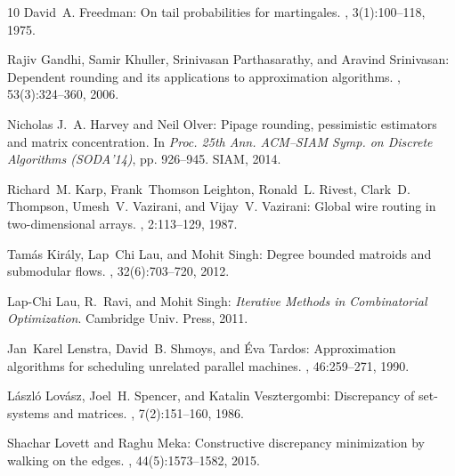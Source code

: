 \documentclass[11pt]{article}
\theoremstyle{definition}
\begin{document}
\begin{thebibliography}{10}
{\sc David~A. Freedman}: On tail probabilities for martingales.
, 3(1):100--118, 1975.

{\sc Rajiv Gandhi, Samir Khuller, Srinivasan Parthasarathy, and Aravind
  Srinivasan}: Dependent rounding and its applications to approximation
  algorithms.
, 53(3):324--360, 2006.
\newblock [\epfmtdoi{10.1145/1147954.1147956}]

{\sc Nicholas J.~A. Harvey and Neil Olver}: Pipage rounding, pessimistic
  estimators and matrix concentration.
\newblock In {\em Proc. 25th Ann. ACM--SIAM Symp. on Discrete Algorithms
  (SODA'14)}, pp. 926--945. SIAM, 2014.
\newblock [\epfmtdoi{10.1137/1.9781611973402.69}]

{\sc Richard~M. Karp, Frank~Thomson Leighton, Ronald~L. Rivest, Clark~D.
  Thompson, Umesh~V. Vazirani, and Vijay~V. Vazirani}: Global wire routing in
  two-dimensional arrays.
, 2:113--129, 1987.
\newblock [\epfmtdoi{10.1007/BF01840353}]

{\sc Tam{\'{a}}s Kir{\'{a}}ly, Lap~Chi Lau, and Mohit Singh}: Degree bounded
  matroids and submodular flows.
, 32(6):703--720, 2012.
\newblock [\epfmtdoi{10.1007/s00493-012-2760-6}]

{\sc Lap-Chi Lau, R.~Ravi, and Mohit Singh}: {\em Iterative Methods in
  Combinatorial Optimization}.
\newblock Cambridge Univ. Press, 2011.

{\sc Jan~Karel Lenstra, David~B. Shmoys, and {\'{E}}va Tardos}: Approximation
  algorithms for scheduling unrelated parallel machines.
, 46:259--271, 1990.
\newblock [\epfmtdoi{10.1007/BF01585745}]

{\sc L\'aszl\'o Lov\'asz, Joel~H. Spencer, and Katalin Vesztergombi}:
  Discrepancy of set-systems and matrices.
, 7(2):151--160, 1986.
\newblock [\epfmtdoi{10.1016/S0195-6698(86)80041-5}]

{\sc Shachar Lovett and Raghu Meka}: Constructive discrepancy minimization by
  walking on the edges.
, 44(5):1573--1582, 2015.
\newblock [\epfmtdoi{10.1137/130929400}]


\end{thebibliography}
\end{document}
